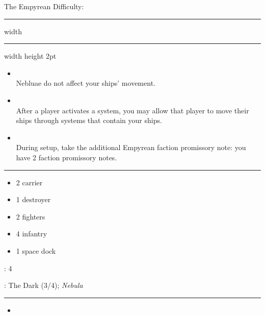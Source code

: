 {\handel\Huge The Empyrean} \hfill {\Large Difficulty: \easy} \vspace{-4pt}\\
\hrule width \hsize \kern 1mm \hrule width \hsize height 2pt


\begin{multicols}{2}


\begin{itemize}
\item {}\\
Nebluae do not affect your ships' movement.
\item {}\\
After a player activates a system, you may allow that player to move their ships through systems that contain your ships.
\item {}\\
During setup, take the additional Empyrean faction promissory note: you have 2 faction promissory notes.
\end{itemize}


\vspace{-10pt}\rule{\hsize}{0.4pt}\vspace{5pt}


\vspace{-5pt}
\begin{multicols}{2}
\begin{itemize}
\item 2 carrier
\item 1 destroyer
\item 2 fighters
\item 4 infantry
\item 1 space dock
\end{itemize}
\end{multicols}

\vspace{-5pt}
: 4

\vspace{2pt}
: The Dark (3/4); \emph{Nebula}

\rule{\hsize}{0.4pt}\vspace{5pt}


\begin{itemize}
\item \tap
\end{itemize}


\end{multicols}
